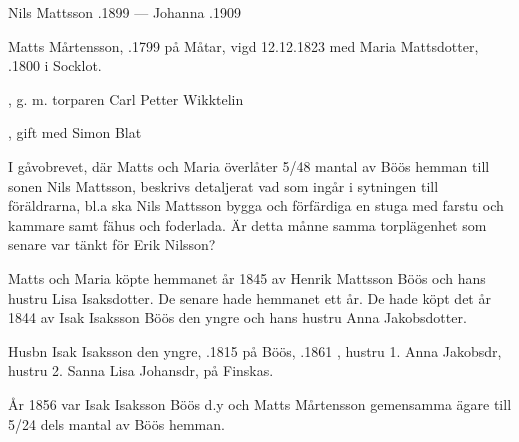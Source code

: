 Nils Mattsson .1899  ---  Johanna .1909


Matts Mårtensson, .1799 på Måtar, vigd 12.12.1823 med  Maria Mattsdotter, .1800 i Socklot.
\begin{jhchildren}
  \item {}
  \item {}
  \item {}, g. m. torparen Carl Petter Wikktelin
  \item {}
  \item {}, gift med Simon Blat
  \item {}
\end{jhchildren}
I gåvobrevet, där Matts och Maria överlåter 5/48 mantal av Böös hemman till sonen Nils Mattsson, beskrivs detaljerat vad som ingår i sytningen till föräldrarna, bl.a ska Nils Mattsson bygga och förfärdiga en stuga med farstu och kammare samt fähus och foderlada. Är detta månne samma torplägenhet som senare var tänkt för Erik Nilsson?

Matts och Maria köpte hemmanet år 1845 av Henrik Mattsson Böös och hans hustru Lisa Isaksdotter. De senare hade hemmanet ett år. De hade köpt det år 1844 av Isak Isaksson Böös den yngre och hans hustru Anna Jakobsdotter.


Husbn Isak Isaksson den yngre, .1815 på Böös, .1861 , hustru 1. Anna Jakobsdr, hustru 2. Sanna Lisa Johansdr,  på Finskas.
\begin{jhchildren}
  \item {}
  \item {}
  \item {}
  \item {}
  \item {}
  \item {}
  \item {}
  \item {}
\end{jhchildren}
År 1856 var Isak Isaksson Böös d.y och Matts Mårtensson gemensamma ägare till 5/24 dels mantal av Böös hemman.



